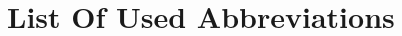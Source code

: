 \tableofcontents
\newpage


\section*{\centering List Of Used Abbreviations}
\begin{adjustwidth}{113pt}{43pt}
	\begin{sortedlist}
	\end{sortedlist}
\end{adjustwidth}
